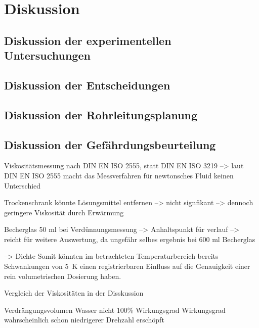 \section{Diskussion}
\label{sec:diskussion}

\subsection{Diskussion der experimentellen Untersuchungen}

\subsection{Diskussion der Entscheidungen}

\subsection{Diskussion der Rohrleitungsplanung}

\subsection{Diskussion der Gefährdungsbeurteilung}

Viskositätsmessung nach DIN EN ISO 2555, statt DIN EN ISO 3219 --> laut DIN EN ISO 2555 macht das Messverfahren für newtonsches Fluid keinen Unterschied

Trockenschrank könnte Lösungsmittel entfernen --> nicht signfikant --> dennoch geringere Viskosität durch Erwärmung

Becherglas 50 ml bei Verdünnungsmessung --> Anhaltspunkt für verlauf --> reicht für weitere Auswertung, da ungefähr selbes ergebnis bei 600 ml Becherglas

--> Dichte Somit könnten im betrachteten Temperaturbereich bereits Schwankungen von \SI{5}{\kelvin} einen registrierbaren Einfluss auf die Genauigkeit einer rein volumetrischen Dosierung haben.

Vergleich der Viskositäten in der Disskussion

Verdrängungsvolumen Wasser nicht 100\% Wirkungsgrad
Wirkungsgrad wahrscheinlich schon niedrigerer Drehzahl erschöpft